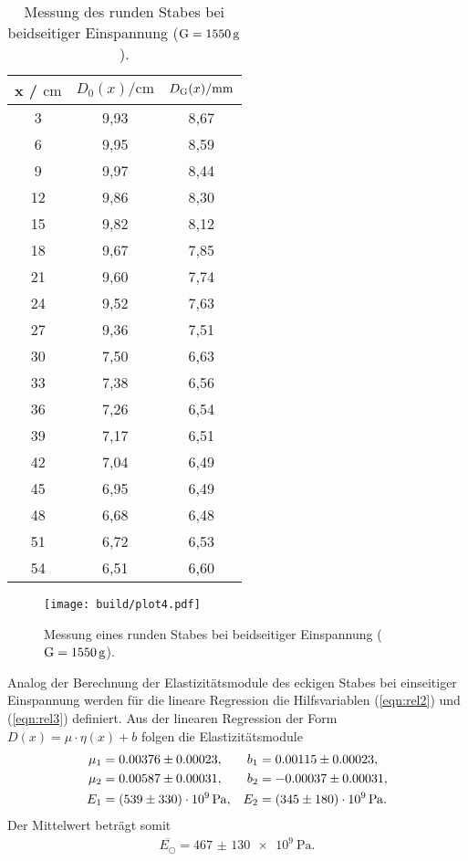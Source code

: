 \sloppy
\begin{table}[H]
  \centering
  \caption{Messung des runden Stabes bei beidseitiger Einspannung ($\text G = \SI{1550}{\gram}$).}
  \label{tab:werte4}
  \begin{tabular}{c c c}
    \toprule
    x / $\si{\centi\meter} $ & $ D_0(x) / \si{\centi\meter}$ & $D_{\text G}(x) / \si{\milli\meter}$ \\
    \midrule
    3 & 9,93 & 8,67 \\
    6 & 9,95 & 8,59 \\
    9 & 9,97 & 8,44 \\
    12 & 9,86 & 8,30 \\
    15 & 9,82 & 8,12 \\
    18 & 9,67 & 7,85 \\
    21 & 9,60 & 7,74 \\
    24 & 9,52 & 7,63 \\
    27 & 9,36 & 7,51 \\
    30 & 7,50 & 6,63 \\
    33 & 7,38 & 6,56 \\
    36 & 7,26 & 6,54 \\
    39 & 7,17 & 6,51 \\
    42 & 7,04 & 6,49 \\
    45 & 6,95 & 6,49 \\
    48 & 6,68 & 6,48 \\
    51 & 6,72 & 6,53 \\
    54 & 6,51 & 6,60 \\
    \bottomrule
  \end{tabular}
\end{table}

\sloppy
\begin{figure}
  \centering
  \texttt{[image: build/plot4.pdf]}
  \caption{Messung eines runden Stabes bei beidseitiger Einspannung ($\text G = \SI{1550}{\gram}$).}
  \label{fig:plot4}
\end{figure}


Analog der Berechnung der Elastizitätsmodule des eckigen Stabes bei einseitiger Einspannung werden für die lineare Regression die 
Hilfsvariablen (\ref{eqn:rel2}) und (\ref{eqn:rel3}) definiert. Aus der linearen Regression der Form $D(x) = \mu\cdot\eta(x)+b$
folgen die Elastizitätsmodule
\begin{align*}
  \mu_1 &= 0.00376 \pm 0.00023, & b_1 &= 0.00115 \pm 0.00023, \\
  \mu_2 &= 0.00587 \pm 0.00031, & b_2 &= -0.00037 \pm 0.00031, \\
  E_1 &= \SI{539 (330)e9}{\Pa}, & E_2 &= \SI{345 (180)e9}{\Pa}.\\
\end{align*}
Der Mittelwert beträgt somit
\begin{align*}
  \overline{E_{\bigcirc}} = \SI{467(130)e9}{\Pa}.
\end{align*}